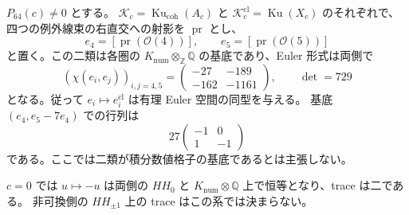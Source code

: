 \begin{corollary}
\label{cmo:cor:rational-euler-comparison}
$P_{64}(c)\ne0$ とする。
$\mathcal K_c=\operatorname{Ku}_{\mathrm{coh}}(A_c)$ と
$\mathcal K_c^{\mathrm{cl}}=\operatorname{Ku}(X_c)$ のそれぞれで、
四つの例外線束の右直交への射影を $\operatorname{pr}$ とし、
\[
 e_4=[\operatorname{pr}(\mathcal O(4))],\qquad
 e_5=[\operatorname{pr}(\mathcal O(5))]
\]
と置く。この二類は各圏の $K_{\mathrm{num}}\otimes_\mathbb Z\mathbb Q$
の基底であり、Euler 形式は両側で
\[
 (\chi(e_i,e_j))_{i,j=4,5}
 =
 \begin{pmatrix}
  -27&-189\\
  -162&-1161
 \end{pmatrix},
 \qquad \det=729
\]
となる。従って $e_i\mapsto e_i^{\mathrm{cl}}$ は有理 Euler 空間の同型を与える。
基底 $(e_4,e_5-7e_4)$ での行列は
\[
 27\begin{pmatrix}-1&0\\1&-1\end{pmatrix}
\]
である。ここでは二類が積分数値格子の基底であるとは主張しない。

$c=0$ では $u\mapsto-u$ は両側の
$HH_0$ と $K_{\mathrm{num}}\otimes\mathbb Q$ 上で恒等となり、trace は二である。
非可換側の $HH_{\pm1}$ 上の trace はこの系では決まらない。
\end{corollary}

